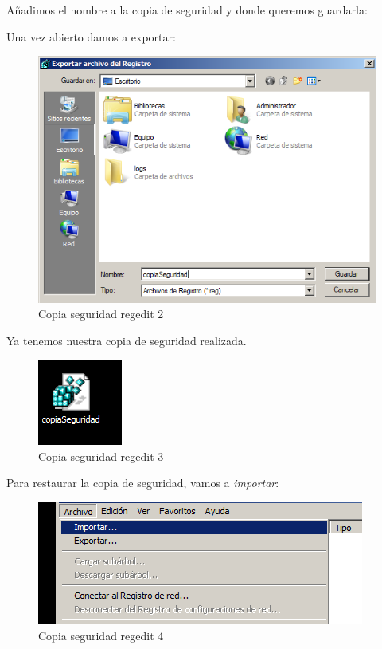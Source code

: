 Añadimos el nombre a la copia de seguridad y donde queremos guardarla:

Una vez abierto damos a exportar:

\begin{figure}[H] %
	\centering
	\includegraphics[scale=0.5]{pics/red2}  %
	\caption{Copia seguridad regedit 2} \label{fig:reg2}
\end{figure}

Ya tenemos nuestra copia de seguridad realizada.

\begin{figure}[H] %
	\centering
	\includegraphics[scale=0.5]{pics/reg3}  %
	\caption{Copia seguridad regedit 3} \label{fig:reg3}
\end{figure}

Para restaurar la copia de seguridad, vamos a \textit{importar}:

\begin{figure}[H] %
	\centering
	\includegraphics[scale=0.5]{pics/reg4}  %
	\caption{Copia seguridad regedit 4} \label{fig:reg4}
\end{figure}

